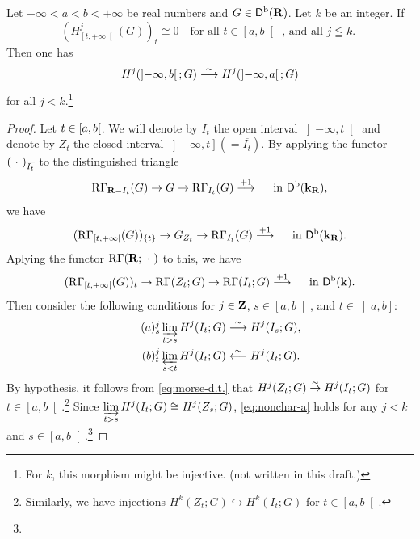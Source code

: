 \begin{Lemma+}\label{Lem:1d-t-morse}
  Let \(-\infty<a<b<+\infty\) be real numbers 
  and \(G\in \Dompb(\rr)\). Let \(k\) be an integer.
  If \[
      \left(H^{j}_{\left[t,+\infty\right[}(G)\right)_t
      \cong 0
      \quad
      \text{
          for all \(t\in\left[a,b\right[\) , 
          and all \(j\leqq k\).
      }
  \]
  Then one has \[
      H^{j}(\left]-\infty,b\right[;G)\simarr
      H^{j}(\left]-\infty,a\right[;G)
  \] for all \(j<k\).\footnote{
      For \(k\), this morphism might be injective.
        (not written in this draft.)
  }
\end{Lemma+}

\begin{proof}
  Let \(t\in \lclosed a,b\ropen\). 
  We will denote by \(I_t\) the open interval \(
      \left]-\infty,t\right[
  \) and denote by \(Z_t\) the closed interval \(
      \left]-\infty,t\right] (= \overline{I_t})
  \).
  By applying the functor \((\blk)_{\overline{I_t}}\) 
  to the distinguished triangle\[
      \RG_{\rr-I_t}(G)\to 
      G\to 
      \RG_{I_t}(G)\overset{+1}{\longrightarrow}
      \quad\text{ in \(\Dompb(\kk_\rr)\)},
  \] we have\[
      (\RG_{[t,+\infty[}(G))_{\{t\}}
      \to G_{Z_t}
      \to 
      \RG_{I_t}(G)
      \overset{+1}{\longrightarrow}
      \quad\text{ in \(\Dompb(\kk_\rr)\)}.
  \]
  Aplying the functor \(\RG(\rr;\blk)\) to this, we have
  \begin{equation}\label{eq:morse-d.t.}
      (\RG_{[t,+\infty[}(G))_{t}
      \to \RG(Z_t;G)
      \to 
      \RG(I_t;G)
      \overset{+1}{\longrightarrow}
      \quad\text{ in \(\Dompb(\kk)\)}.
  \end{equation}
  Then consider the following conditions for 
  \(j\in\zz\), \(s\in\left[a,b\right[\), and 
  \(t\in \left]a,b\right]\):
  \begin{align}
      \tag*{\((a)^j_s\)}\label{eq:nonchar-a}
      \indlim[t>s] H^{j}(I_t;G) &\simarr H^{j}(I_s;G),\\
      \tag*{\((b)^j_t\)}\label{eq:nonchar-b}
      \prolim[s<t] H^{j}(I_t;G) &\simrra H^{j}(I_t;G).
  \end{align}
  By hypothesis, 
  it follows from \eqref{eq:morse-d.t.} that 
  \(
    H^{j}(Z_t;G)\simar H^{j}(I_t;G)
  \) for \(t\in \left[a,b\right[\).\footnote{
    Similarly, we have injections \(
      H^{k}(Z_t;G)\hookrightarrow H^{k}(I_t;G)
  \) for \(t\in \left[a,b\right[\). 
  } 
  Since \(
      \indlim[t>s] H^{j}(I_t;G)\cong H^{j}(Z_s;G)
  \), \ref{eq:nonchar-a} holds 
  for any \(j<k\) and \(s\in\left[a,b\right[\).\footnote{
}
\end{proof}
